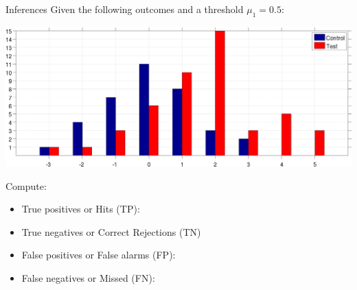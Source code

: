 \documentclass{beamer}
\begin{document}
% 


\begin{frame}{Inferences}
  Given the following outcomes and a threshold $\mu_{1} = 0.5$:

  \begin{center}
    \includegraphics[scale=0.055]{./Control_Test.jpg}
  \end{center}

  Compute:
  \begin{itemize}
    \item True positives or Hits (TP):
    \item True negatives or Correct Rejections (TN)
    \item False positives or False alarms (FP):
    \item False negatives or Missed (FN):
  \end{itemize}
\end{frame}
\end{document}
